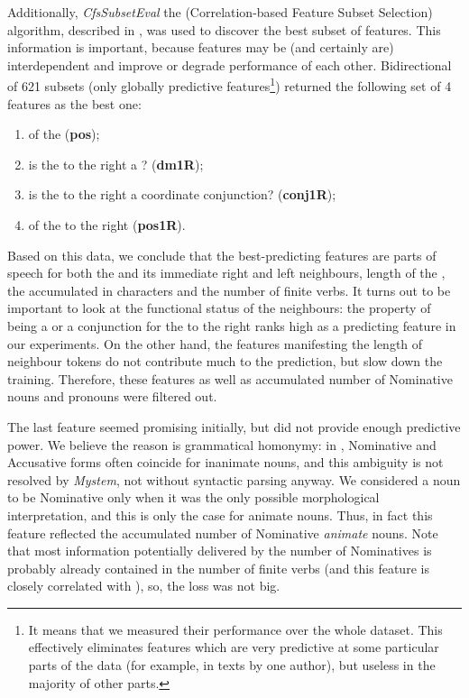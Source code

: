 \documentclass[output=paper]{langsci/langscibook.cls}
\begin{document}
\largerpage
Additionally, \textit{CfsSubsetEval} the (Correlation-based Feature Subset Selection) algorithm, described in \citet{Hall:1998}, was used to discover the best subset of features. This information is important, because features may be (and certainly are) interdependent and improve or degrade performance of each other. Bidirectional  of 621 subsets (only globally predictive features\footnote{It means that we measured their performance over the whole dataset. This effectively eliminates features which are very predictive at some particular parts of the data (for example, in texts by one author), but useless in the majority of other parts.}) returned the following set of 4 features as the best one:

\begin{enumerate}
\item {} of the  (\textbf{pos});
\item is the  to the right a ? (\textbf{dm1R});
\item is the  to the right a coordinate conjunction? (\textbf{conj1R});
\item {} of the  to the right (\textbf{pos1R}).
\end{enumerate}

Based on this data, we conclude that the best-predicting features are parts of speech for both the  and its immediate right and left neighbours, length of the , the accumulated  in characters and the number of finite verbs. It turns out to be important to look at the functional status of the neighbours: the property of being a  or a conjunction for the  to the right ranks high as a predicting feature in our experiments. On the other hand, the features manifesting the length of neighbour tokens do not contribute much to the prediction, but slow down the training. Therefore, these features as well as accumulated number of Nominative nouns and pronouns were filtered out. 

The last feature seemed promising initially, but did not provide enough predictive power. We believe the reason is grammatical homonymy: in , Nominative and Accusative forms often coincide for inanimate nouns, and this ambiguity is not resolved by \textit{Mystem}, not without syntactic parsing anyway. We considered a noun to be Nominative only when it was the only possible morphological interpretation, and this is only the case for animate nouns. Thus, in fact this feature reflected the accumulated number of Nominative \textit{animate} nouns. Note that most information potentially delivered by the number of Nominatives is probably already contained in the number of finite verbs (and this feature is closely correlated with ), so, the loss was not big.
\end{document}
